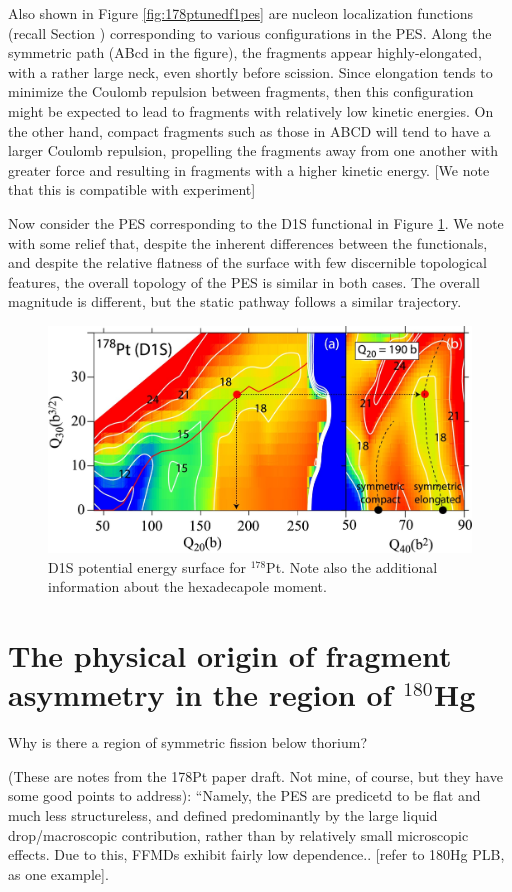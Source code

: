 Also shown in Figure \ref{fig:178ptunedf1pes} are nucleon localization functions (recall Section ) corresponding to various configurations in the PES. Along the symmetric path (ABcd in the figure), the fragments appear highly-elongated, with a rather large neck, even shortly before scission. Since elongation tends to minimize the Coulomb repulsion between fragments, then this configuration might be expected to lead to fragments with relatively low kinetic energies. On the other hand, compact fragments such as those in ABCD will tend to have a larger Coulomb repulsion, propelling the fragments away from one another with greater force and resulting in fragments with a higher kinetic energy. [We note that this is compatible with experiment]

Now consider the PES corresponding to the D1S functional in Figure \ref{fig:178ptd1spes}. We note with some relief that, despite the inherent differences between the functionals, and despite the relative flatness of the surface with few discernible topological features, the overall topology of the PES is similar in both cases. The overall magnitude is different, but the static pathway follows a similar trajectory.

\begin{figure}
	\centering
	\includegraphics[width=0.7\linewidth]{TeX_files/178Pt_D1S_pes.jpg}
	\caption[D1S potential energy surface for $^{178}$Pt]{D1S potential energy surface for $^{178}$Pt. Note also the additional information about the hexadecapole moment.}
	\label{fig:178ptd1spes}
\end{figure}



\section{The physical origin of fragment asymmetry in the region of $^{180}$Hg}

Why is there a region of symmetric fission below thorium?

(These are notes from the 178Pt paper draft. Not mine, of course, but they have some good points to address): ``Namely, the PES are predicetd to be flat and much less structureless, and defined predominantly by the large liquid drop/macroscopic contribution, rather than by relatively small microscopic effects. Due to this, FFMDs exhibit fairly low dependence..  [refer to 180Hg PLB, as one example].

